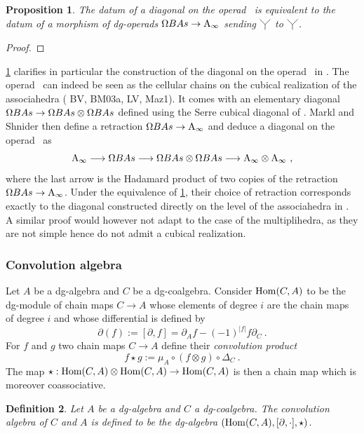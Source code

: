 \documentclass[twoside, 12pt]{amsart}
\newtheorem{definition}{Definition}[section]
\newtheorem{proposition}[definition]{Proposition}
\theoremstyle{remark}
\begin{document}
\begin{proposition}\label{prop:retract}
The datum of a diagonal on the operad \Ainf\ is equivalent to the datum of a morphism of dg-operads $\Omega B As \rightarrow \mathrm{A}_\infty$ sending $\arbreopdeux$ to $\arbreopdeux$.
\end{proposition}

\begin{proof}
\end{proof}

\cref{prop:retract} clarifies in particular the construction of the diagonal on the operad \Ainf\ in \cite{MarklShnider06}. 
The operad \ombas\ can indeed be seen as the cellular chains on the cubical realization of the associahedra (\cite{} BV, BM03a, LV, Maz1). 
It comes with an elementary diagonal $\Omega B As \rightarrow \Omega B As \otimes \Omega B As$ defined using the Serre cubical diagonal of \cite{Serre51}.
Markl and Shnider then define a retraction $\Omega B As \rightarrow \mathrm{A}_\infty$ and deduce a diagonal on the operad \Ainf\ as 
\[ \mathrm{A}_\infty \longrightarrow \Omega B As \longrightarrow \Omega B As \otimes \Omega B As \longrightarrow \mathrm{A}_\infty \otimes \mathrm{A}_\infty \ , \]
where the last arrow is the Hadamard product of two copies of the retraction $\Omega B As \rightarrow \mathrm{A}_\infty$. 
Under the equivalence of \cref{prop:retract}, their choice of retraction corresponds exactly to the diagonal constructed directly on the level of the associahedra in \cite{MTTV19}.
A similar proof would however not adapt to the case of the multiplihedra, as they are not simple hence do not admit a cubical realization.

\subsubsection{Convolution algebra}

Let $A$ be a dg-algebra and $C$ be a dg-coalgebra. 
Consider $\mathrm{Hom} (C,A)$ to be the dg-module of chain maps $C \rightarrow A$ whose elements of degree $i$ are the chain maps of degree $i$ and whose differential is defined by 
\[ \partial (f) := [ \partial , f ] = \partial_A f - (-1)^{|f|} f \partial_C \ . \]
For $f$ and $g$ two chain maps $C \rightarrow A$ define their \emph{convolution product}
\[ f \star g := \mu_A \circ ( f \otimes g) \circ \Delta_C \ . \]
The map $\star : \mathrm{Hom} (C,A) \otimes \mathrm{Hom} (C,A) \rightarrow \mathrm{Hom} (C,A)$ is then a chain map which is moreover coassociative.

\begin{definition}
Let $A$ be a dg-algebra and $C$ a dg-coalgebra. The \emph{convolution algebra of $C$ and $A$} is defined to be the dg-algebra $(\mathrm{Hom} (C,A) , [ \partial , \cdot ] , \star)$.
\end{definition}
\end{document}
